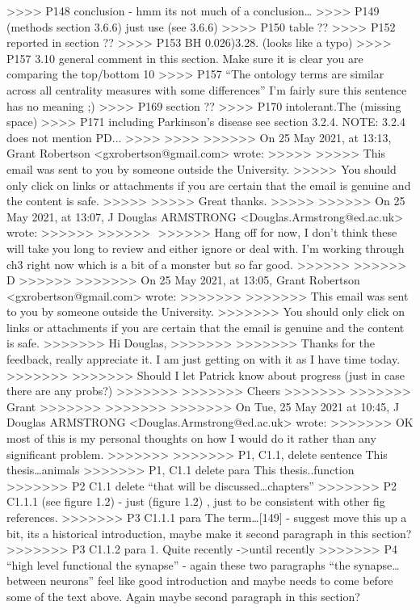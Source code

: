 >>>> P148 conclusion - hmm its not much of a conclusion…
>>>> P149 (methods section 3.6.6) just use (see 3.6.6)
>>>> P150 table ??
>>>> P152 reported in section ??
>>>> P153 BH 0.026)3.28. (looks like a typo)
>>>> P157 3.10 general comment in this section. Make sure it is clear you are comparing the top/bottom 10%
>>>> P157 “The ontology terms are similar across all centrality measures with some differences” I’m fairly sure this sentence has no meaning ;)
>>>> P169 section ??
>>>> P170 intolerant.The (missing space)
>>>> P171 including Parkinson’s disease see section 3.2.4. NOTE: 3.2.4 does not mention PD...
>>>>
>>>>
>>>>>> On 25 May 2021, at 13:13, Grant Robertson <gxrobertson@gmail.com> wrote:
>>>>>
>>>>> This email was sent to you by someone outside the University.
>>>>> You should only click on links or attachments if you are certain that the email is genuine and the content is safe.
>>>>>
>>>>> Great thanks.
>>>>>
>>>>>> On 25 May 2021, at 13:07, J Douglas ARMSTRONG <Douglas.Armstrong@ed.ac.uk> wrote:
>>>>>>
>>>>>> ﻿
>>>>>> Hang off for now, I don’t think these will take you long to review and either ignore or deal with. I’m working through ch3 right now which is a bit of a monster but so far good.
>>>>>>
>>>>>> D
>>>>>>
>>>>>>> On 25 May 2021, at 13:05, Grant Robertson <gxrobertson@gmail.com> wrote:
>>>>>>>
>>>>>>> This email was sent to you by someone outside the University.
>>>>>>> You should only click on links or attachments if you are certain that the email is genuine and the content is safe.
>>>>>>> Hi Douglas,
>>>>>>>
>>>>>>> Thanks for the feedback, really appreciate it. I am just getting on with it as I have time today.
>>>>>>>
>>>>>>> Should I let Patrick know about progress (just in case there are any probs?)
>>>>>>>
>>>>>>> Cheers
>>>>>>>
>>>>>>> Grant
>>>>>>>
>>>>>>>
>>>>>>> On Tue, 25 May 2021 at 10:45, J Douglas ARMSTRONG <Douglas.Armstrong@ed.ac.uk> wrote:
>>>>>>> OK most of this is my personal thoughts on how I would do it rather than any significant problem.
>>>>>>>
>>>>>>> P1, C1.1, delete sentence This thesis…animals
>>>>>>> P1, C1.1 delete para This thesis..function
>>>>>>> P2 C1.1 delete “that will be discussed…chapters”
>>>>>>> P2 C1.1.1 (see figure 1.2) - just (figure 1.2) , just to be consistent with other fig references.
>>>>>>> P3 C1.1.1 para The term…[149] - suggest move this up a bit, its a historical introduction, maybe make it second paragraph in this section?
>>>>>>> P3 C1.1.2 para 1. Quite recently ->until recently
>>>>>>> P4 “high level functional the synapse” - again these two paragraphs “the synapse…between neurons” feel like good introduction and maybe needs to come before some of the text above. Again maybe second paragraph in this section?
